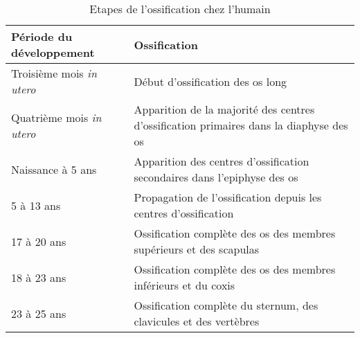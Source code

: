 \begin{table}[!htb]
{
\footnotesize
{}
\begin{tabularx}{\textwidth}{L L}
\toprule
\textbf{Période du développement} & \textbf{Ossification} \\ 
\midrule
Troisième mois \textit{in utero} & Début d'ossification des os long \\ 

Quatrième mois \textit{in utero} & Apparition de la majorité des centres d'ossification primaires dans la diaphyse des os \\ 

Naissance à 5 ans & Apparition des centres d'ossification secondaires dans l'epiphyse des os \\ 

5 à 13 ans & Propagation de l'ossification depuis les centres d'ossification \\ 

17 à 20 ans & Ossification complète des os des membres supérieurs et des scapulas \\ 

18 à 23 ans & Ossification complète des os des membres inférieurs et du coxis \\ 

23 à 25 ans & Ossification complète du sternum, des clavicules et des vertèbres \\ 
\bottomrule
\end{tabularx}
}
\caption[Ossification chez l'humain]
{
Etapes de l'ossification chez l'humain
}
\label{tab:ossification}
\end{table}